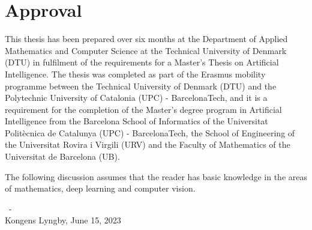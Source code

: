 \section*{Approval}
This thesis has been prepared over six months at the Department of Applied Mathematics and Computer Science at the Technical University of Denmark (DTU) in fulfilment of the requirements for a Master's Thesis on Artificial Intelligence. The thesis was completed as part of the Erasmus mobility programme between the Technical University of Denmark (DTU) and the Polytechnic University of Catalonia (UPC) - BarcelonaTech, and it is a requirement for the completion of the Master's degree program in Artificial Intelligence from the Barcelona School of Informatics of the Universitat Politècnica de Catalunya (UPC) - BarcelonaTech, the School of Engineering of the Universitat Rovira i Virgili (URV) and the Faculty of Mathematics of the Universitat de Barcelona (UB).


The following discussion assumes that the reader has basic knowledge in the areas of mathematics, deep learning and computer vision.

\vspace{300pt}

\vfill

\begin{center}
\thesisauthor~-~\studentnumber 
\\
\vspace{20pt}
Kongens Lyngby, June 15, 2023
\end{center}

\vfill

